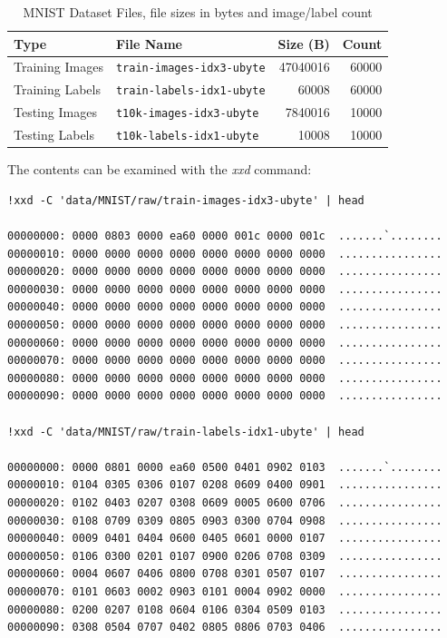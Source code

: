 \begin{table}[h]
\centering
\begin{tabular}{|l|l|r|r|}
\hline
\textbf{Type}             & \textbf{File Name}                       & \textbf{Size (B)} & \textbf{Count} \\ \hline
Training Images & \texttt{train-images-idx3-ubyte} & 47040016           & 60000 \\
Training Labels & \texttt{train-labels-idx1-ubyte} & 60008             & 60000 \\
Testing Images  & \texttt{t10k-images-idx3-ubyte}  & 7840016           & 10000 \\
Testing Labels  & \texttt{t10k-labels-idx1-ubyte}  & 10008              & 10000 \\ \hline
\end{tabular}
\caption{MNIST Dataset Files, file sizes in bytes and image/label count}
\label{table:mnist_files_b}
\end{table}
The contents can be examined with the \textit{xxd} command:
\begin{verbatim}
!xxd -C 'data/MNIST/raw/train-images-idx3-ubyte' | head

00000000: 0000 0803 0000 ea60 0000 001c 0000 001c  .......`........
00000010: 0000 0000 0000 0000 0000 0000 0000 0000  ................
00000020: 0000 0000 0000 0000 0000 0000 0000 0000  ................
00000030: 0000 0000 0000 0000 0000 0000 0000 0000  ................
00000040: 0000 0000 0000 0000 0000 0000 0000 0000  ................
00000050: 0000 0000 0000 0000 0000 0000 0000 0000  ................
00000060: 0000 0000 0000 0000 0000 0000 0000 0000  ................
00000070: 0000 0000 0000 0000 0000 0000 0000 0000  ................
00000080: 0000 0000 0000 0000 0000 0000 0000 0000  ................
00000090: 0000 0000 0000 0000 0000 0000 0000 0000  ................

!xxd -C 'data/MNIST/raw/train-labels-idx1-ubyte' | head

00000000: 0000 0801 0000 ea60 0500 0401 0902 0103  .......`........
00000010: 0104 0305 0306 0107 0208 0609 0400 0901  ................
00000020: 0102 0403 0207 0308 0609 0005 0600 0706  ................
00000030: 0108 0709 0309 0805 0903 0300 0704 0908  ................
00000040: 0009 0401 0404 0600 0405 0601 0000 0107  ................
00000050: 0106 0300 0201 0107 0900 0206 0708 0309  ................
00000060: 0004 0607 0406 0800 0708 0301 0507 0107  ................
00000070: 0101 0603 0002 0903 0101 0004 0902 0000  ................
00000080: 0200 0207 0108 0604 0106 0304 0509 0103  ................
00000090: 0308 0504 0707 0402 0805 0806 0703 0406  ................
\end{verbatim}

